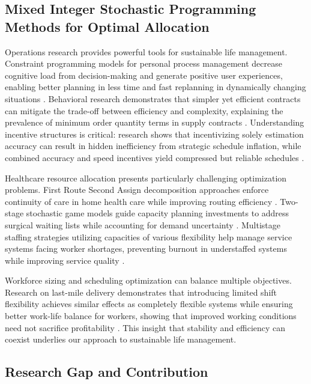 \subsection{Mixed Integer Stochastic Programming Methods for Optimal Allocation}

Operations research provides powerful tools for sustainable life management. Constraint programming models for personal process management decrease cognitive load from decision-making and generate positive user experiences, enabling better planning in less time and fast replanning in dynamically changing situations \citep{oruç_constraint_2022}. Behavioral research demonstrates that simpler yet efficient contracts can mitigate the trade-off between efficiency and complexity, explaining the prevalence of minimum order quantity terms in supply contracts \citep{tuncel_why_2022}. Understanding incentive structures is critical: research shows that incentivizing solely estimation accuracy can result in hidden inefficiency from strategic schedule inflation, while combined accuracy and speed incentives yield compressed but reliable schedules \citep{lorko_hidden_2023}.

Healthcare resource allocation presents particularly challenging optimization problems. First Route Second Assign decomposition approaches enforce continuity of care in home health care while improving routing efficiency \citep{lahrichi_first_2022}. Two-stage stochastic game models guide capacity planning investments to address surgical waiting lists while accounting for demand uncertainty \citep{acuna_two_2024}. Multistage staffing strategies utilizing capacities of various flexibility help manage service systems facing worker shortages, preventing burnout in understaffed systems while improving service quality \citep{yuan_managing_2025}.

Workforce sizing and scheduling optimization can balance multiple objectives. Research on last-mile delivery demonstrates that introducing limited shift flexibility achieves similar effects as completely flexible systems while ensuring better work-life balance for workers, showing that improved working conditions need not sacrifice profitability \citep{mandal_tactical_2025}. This insight that stability and efficiency can coexist underlies our approach to sustainable life management.



\subsection{Research Gap and Contribution}

